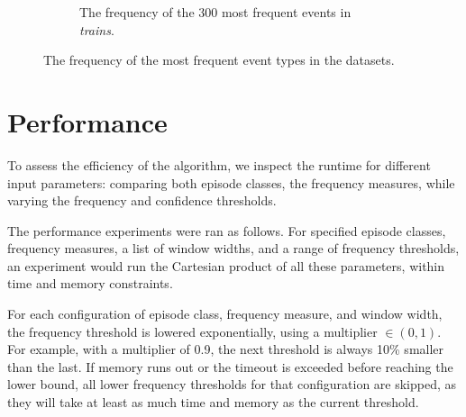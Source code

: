 \begin{figure}
\par\bigskip

\begin{subfigure}[b]{\textwidth}
\centering


\caption{The frequency of the 300 most frequent events in \emph{trains}.}
\label{fig:frequency-plot-trains}
\end{subfigure}

\caption{The frequency of the most frequent event types in the datasets.}
\label{fig:alphabet-frequencies}
\end{figure}


\section{Performance}
\label{sec:performance}

To assess the efficiency of the algorithm, we inspect the runtime for different input parameters: comparing both episode classes, the frequency measures, while varying
the frequency and confidence thresholds.

The performance experiments were ran as follows. For specified episode classes, frequency measures, a list of window widths, and a range of frequency thresholds, an experiment would run the Cartesian product of all these parameters, within time and memory constraints.

For each configuration of episode class, frequency measure, and window width, the frequency threshold is lowered exponentially, using a multiplier $ \in (0, 1) $. For example, with a multiplier of 0.9, the next threshold is always 10\% smaller than the last. If memory runs out or the timeout is exceeded before reaching the lower bound, all lower frequency thresholds for that configuration are skipped, as they will take at least as much time and memory as the current threshold.

